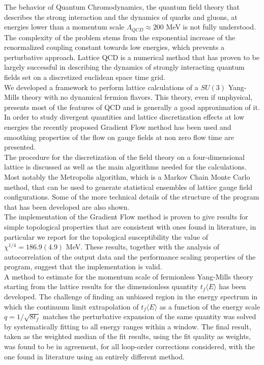 The behavior of Quantum Chromodynamics, the quantum field theory that describes the strong interaction and the dynamics of quarks and gluons, at energies lower than a momentum scale $\Lambda_{QCD} \approx 200$ MeV is not fully understood. The complexity of the problem stems from the exponential increase of the renormalized coupling constant towards low energies, which prevents a perturbative approach. Lattice QCD is a numerical method that has proven to be largely successful in describing the dynamics of strongly interacting quantum fields set on a discretized euclidean space time grid.\\

We developed a framework to perform lattice calculations of a $SU(3)$ Yang-Mills theory with no dynamical fermion flavors. This theory, even if unphysical, presents most of the features of QCD and is generally a good approximation of it. In order to study divergent quantities and lattice discretization effects at low energies the recently proposed Gradient Flow method \cite{luscher_properties_2010} has been used and smoothing properties of the flow on gauge fields at non zero flow time are presented. \\
The procedure for the discretization of the field theory on a four-dimensional lattice is discussed as well as the main algorithms needed for the calculations. Most notably the Metropolis algorithm, which is a Markov Chain Monte Carlo method, that can be used to generate statistical ensembles of lattice gauge field configurations. Some of the more technical details of the structure of the program that has been developed are also shown.\\

The implementation of the Gradient Flow method is proven to give results for simple topological properties that are consistent with ones found in literature, in particular we report for the topological susceptibility the value of $\chi^{1/4} = 186.9(4.9)$ MeV. These results, together with the analysis of autocorrelation of the output data and the performance scaling properties of the program, suggest that the implementation is valid.\\
A method to estimate for the momentum scale of fermionless Yang-Mills theory starting from the lattice results for the dimensionless quantity $t_f\langle E \rangle$ has been developed. The challenge of finding an unbiased region in the energy spectrum in which the continuum limit extrapolation of $t_f\langle E \rangle$ as a function of the energy scale $q=1/\sqrt{8t_f}$ matches the perturbative expansion of the same quantity was solved by systematically fitting to all energy ranges within a window. The final result, taken as the weighted median of the fit results, using the fit quality as weights, was found to be in agreement, for all loop-order corrections considered, with the one found in literature \cite{capitani_non-perturbative_1999} using an entirely different method.

